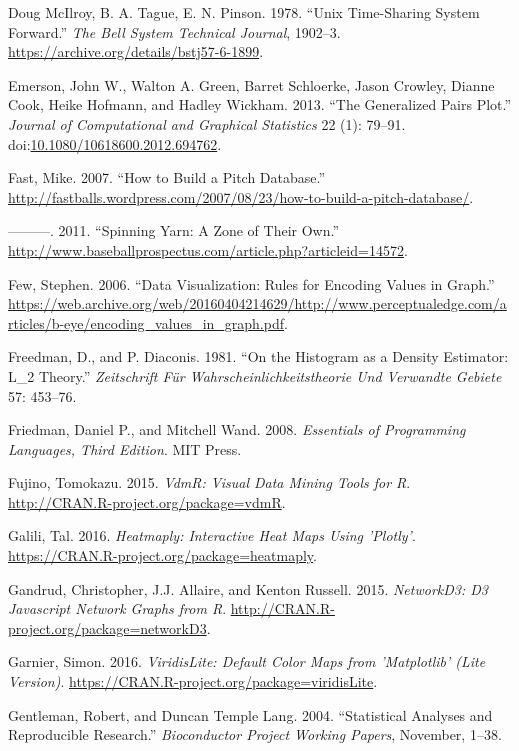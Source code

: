 \documentclass[12pt,]{isuthesis}
\begin{document}
\hypertarget{ref-unix}{}
Doug McIlroy, B. A. Tague, E. N. Pinson. 1978. ``Unix Time-Sharing
System Forward.'' \emph{The Bell System Technical Journal}, 1902--3.
\url{https://archive.org/details/bstj57-6-1899}.

\hypertarget{ref-gpp}{}
Emerson, John W., Walton A. Green, Barret Schloerke, Jason Crowley,
Dianne Cook, Heike Hofmann, and Hadley Wickham. 2013. ``The Generalized
Pairs Plot.'' \emph{Journal of Computational and Graphical Statistics}
22 (1): 79--91.
doi:\href{https://doi.org/10.1080/10618600.2012.694762}{10.1080/10618600.2012.694762}.

\hypertarget{ref-database}{}
Fast, Mike. 2007. ``How to Build a Pitch Database.''
\url{http://fastballs.wordpress.com/2007/08/23/how-to-build-a-pitch-database/}.

\hypertarget{ref-Strikezones}{}
---------. 2011. ``Spinning Yarn: A Zone of Their Own.''
\url{http://www.baseballprospectus.com/article.php?articleid=14572}.

\hypertarget{ref-few-values}{}
Few, Stephen. 2006. ``Data Visualization: Rules for Encoding Values in
Graph.''
\url{https://web.archive.org/web/20160404214629/http://www.perceptualedge.com/articles/b-eye/encoding_values_in_graph.pdf}.

\hypertarget{ref-FD}{}
Freedman, D., and P. Diaconis. 1981. ``On the Histogram as a Density
Estimator: L\_2 Theory.'' \emph{Zeitschrift Für
Wahrscheinlichkeitstheorie Und Verwandte Gebiete} 57: 453--76.

\hypertarget{ref-eopl}{}
Friedman, Daniel P., and Mitchell Wand. 2008. \emph{Essentials of
Programming Languages, Third Edition}. MIT Press.

\hypertarget{ref-vdmR}{}
Fujino, Tomokazu. 2015. \emph{VdmR: Visual Data Mining Tools for R}.
\url{http://CRAN.R-project.org/package=vdmR}.

\hypertarget{ref-heatmaply}{}
Galili, Tal. 2016. \emph{Heatmaply: Interactive Heat Maps Using
'Plotly'}. \url{https://CRAN.R-project.org/package=heatmaply}.

\hypertarget{ref-networkD3}{}
Gandrud, Christopher, J.J. Allaire, and Kenton Russell. 2015.
\emph{NetworkD3: D3 Javascript Network Graphs from R}.
\url{http://CRAN.R-project.org/package=networkD3}.

\hypertarget{ref-viridisLite}{}
Garnier, Simon. 2016. \emph{ViridisLite: Default Color Maps from
'Matplotlib' (Lite Version)}.
\url{https://CRAN.R-project.org/package=viridisLite}.

\hypertarget{ref-Gentleman:Lang}{}
Gentleman, Robert, and Duncan Temple Lang. 2004. ``Statistical Analyses
and Reproducible Research.'' \emph{Bioconductor Project Working Papers},
November, 1--38.
\end{document}
